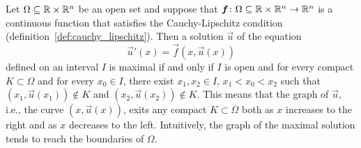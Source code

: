 \begin{proposition}
\label{prop:edo_massimale}
Let $\Omega \subseteq {\mathbb R}\times {\mathbb R}^n$ be an open set and suppose that $\boldsymbol f\colon \Omega\subseteq {\mathbb R}\times{\mathbb R}^n\to{\mathbb R}^n$ is a continuous function that
satisfies the Cauchy-Lipschitz condition
(definition~\ref{def:cauchy_lipschitz}). Then a solution $\vec u$ of the
equation
\begin{equation}\label{eq:edo_normale_ordine_uno}
  \vec u'(x) = \vec f(x, \vec u(x))
\end{equation}
defined on an interval $I$ is maximal if and only if $I$ is open and for every
compact $K\subset \Omega$ and for every $x_0 \in I$, there exist $x_1,x_2\in I$,
$x_1 < x_0 < x_2$ such that $(x_1, \vec u(x_1))\not \in K$ and $(x_2,\vec
u(x_2)) \not \in K$. This means that the graph of $\vec u$, i.e., the curve
$(x,\vec u(x))$, exits any compact $K\subset \Omega$ both as $x$ increases to
the right and as $x$ decreases to the left. Intuitively, the graph of the
maximal solution tends to reach the boundaries of $\Omega$.
\end{proposition}
%
